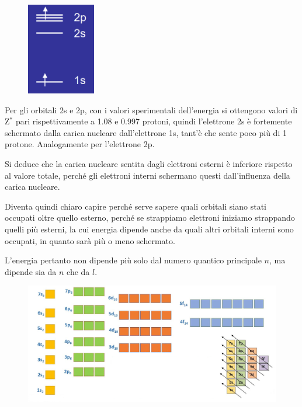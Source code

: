 \hspace{0.5cm}\begin{minipage}{0.25\textwidth}
  \begin{figure}[H]
    \includegraphics[width=3cm]{immagini/elettrone_2p.png}
  \end{figure}
\end{minipage}
\begin{minipage}{0.7\textwidth}
  \vspace{0.6cm}Per gli orbitali 2s e 2p, con i valori sperimentali dell'energia si ottengono valori di Z$^*$ pari rispettivamente a 1.08 e 0.997 protoni, quindi l'elettrone 2s è fortemente schermato dalla carica nucleare dall'elettrone 1s, tant'è che sente poco più di 1 protone. Analogamente per l'elettrone 2p.

  Si deduce che la carica nucleare sentita dagli elettroni esterni è inferiore rispetto al valore totale, perché gli elettroni interni schermano questi dall'influenza della carica nucleare.
\end{minipage}

\vspace{0.3cm}Diventa quindi chiaro capire perché serve sapere quali orbitali siano stati occupati oltre quello esterno, perché se strappiamo elettroni iniziamo strappando quelli più esterni, la cui energia dipende anche da quali altri orbitali interni sono occupati, in quanto sarà più o meno schermato.

L'energia pertanto non dipende più solo dal numero quantico principale $n$, ma dipende sia da $n$ che da $l$.

\begin{figure}[htp]
  \centering
  \includegraphics[width=14cm]{immagini/livelli_orbitali.png}
\end{figure}

